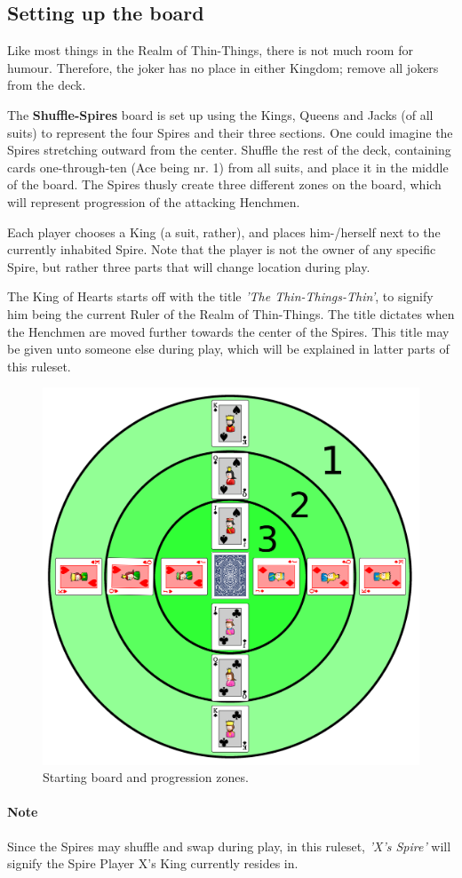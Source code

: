 
\subsection{Setting up the board}
\label{sec:settinguptheboard}
Like most things in the Realm of Thin-Things, there is not much room for humour.
Therefore, the joker has no place in either Kingdom; remove all jokers from the deck.

The \textbf{Shuffle-Spires} board is set up using the Kings, Queens and Jacks (of all suits) to represent the four Spires and their three sections.
One could imagine the Spires stretching outward from the center.
Shuffle the rest of the deck, containing cards one-through-ten (Ace being nr. 1) from all suits, and place it in the middle of the board.
The Spires thusly create three different zones on the board, which will represent progression of the attacking Henchmen.

Each player chooses a King (a suit, rather), and places him-/herself next to the currently inhabited Spire.
Note that the player is not the owner of any specific Spire, but rather three parts that will change location during play.

The King of Hearts starts off with the title \textit{'The Thin-Things-Thin'}, to signify him being the current Ruler of the Realm of Thin-Things.
The title dictates when the Henchmen are moved further towards the center of the Spires.
This title may be given unto someone else during play, which will be explained in latter parts of this ruleset.

\begin{figure}[h!]
	\centering
	\includegraphics[width=\linewidth]{img/starting.png}
	\caption{Starting board and progression zones.}
	\label{fig:starting}
\end{figure}

\paragraph{Note}
Since the Spires may shuffle and swap during play, in this ruleset, \textit{'X's Spire'} will signify the Spire Player X's King currently resides in.
